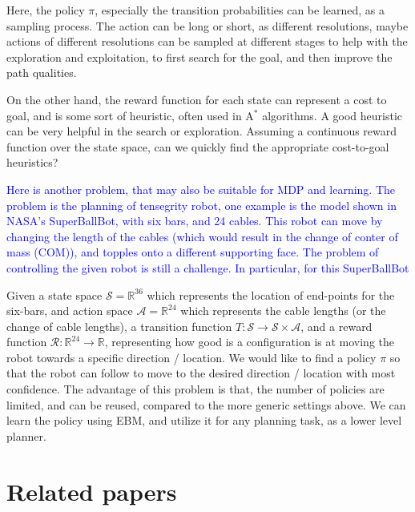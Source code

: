 \documentclass{article}
\begin{document}
Here, the policy $\pi$, especially the transition probabilities can be learned, as a sampling process. The action can be long or short, as different resolutions, maybe actions of different resolutions can be sampled at different stages to help with the exploration and exploitation, to first search for the goal, and then improve the path qualities. 

On the other hand, the reward function for each state can represent a cost to goal, and is some sort of heuristic, often used in A$^*$ algorithms. A good heuristic can be very helpful in the search or exploration. Assuming a continuous reward function over the state space, can we quickly find the appropriate cost-to-goal heuristics? 


\textcolor{blue}{Here is another problem, that may also be suitable for MDP and learning. The problem is the planning of tensegrity robot, one example is the model shown in NASA's SuperBallBot, with six bars, and 24 cables. This robot can move by changing the length of the cables (which would result in the change of conter of mass (COM)), and topples onto a different supporting face. The problem of controlling the given robot is still a challenge. In particular, for this SuperBallBot}

Given a state space $\mathcal{S} = \mathbb{R}^36$ which represents the location of end-points for the six-bars, and action space $\mathcal{A} = \mathbb{R}^24$ which represents the cable lengths (or the change of cable lengths), a transition function $T:\mathcal{S}\rightarrow\mathcal{S}\times \mathcal{A}$, and a reward function $\mathcal{R}:\mathbb{R}^24\rightarrow \mathbb{R}$, representing how good is a configuration is at moving the robot towards a specific direction / location. We would like to find a policy $\pi$ so that the robot can follow to move to the desired direction / location with most confidence. The advantage of this problem is that, the number of policies are limited, and can be reused, compared to the more generic settings above. We can learn the policy using EBM, and utilize it for any planning task, as a lower level planner. 




\section{Related papers}
\end{document}
